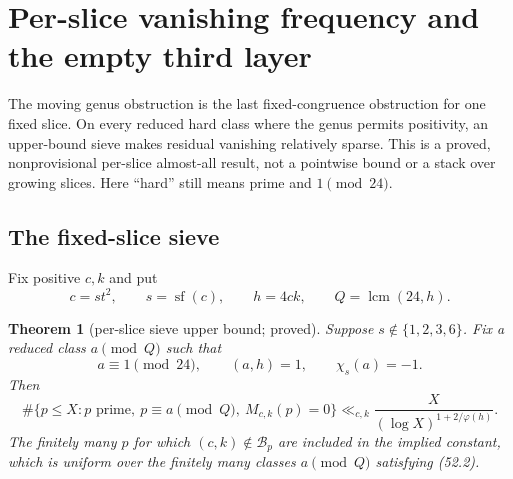 \documentclass[10pt,reqno]{amsart}
\newtheorem{theorem}{Theorem}[section]
\theoremstyle{definition}
\newcommand{\lcm}{\operatorname {lcm}}
\newcommand{\1}{\mathbf 1}
\begin{document}
\section{Per-slice vanishing frequency and the empty third layer}
\label{sec:slice-sieve}
The moving genus obstruction is the last fixed-congruence obstruction for
one fixed slice.  On every reduced hard class where the genus permits
positivity, an upper-bound sieve makes residual vanishing relatively sparse.
This is a proved, nonprovisional per-slice almost-all result, not a pointwise
bound or a stack over growing slices.  Here ``hard'' still means prime and
$1\pmod {24}$.

\subsection{The fixed-slice sieve}
Fix positive $c,k$ and put
\begin{equation}\tag{52.1}
 c=st^2,\qquad s=\operatorname {sf}(c),\qquad
 h=4ck,\qquad Q=\lcm(24,h).
\end{equation}
\begin{theorem}[per-slice sieve upper bound; proved]
\label{thm:per-slice-sieve}
Suppose $s\notin\{1,2,3,6\}$.  Fix a reduced class $a\pmod Q$ such that
\begin{equation}\tag{52.2}
 a\equiv1\pmod {24},\qquad (a,h)=1,\qquad \chi_s(a)=-1.
\end{equation}
Then
\begin{equation}\tag{52.3}
 \#\{p\leq X:p\text{ prime},\ p\equiv a\pmod Q,
                    \ M_{c,k}(p)=0\}
 \ll_{c,k}\frac{X}{(\log X)^{1+2/\varphi(h)}}.
\end{equation}
The finitely many $p$ for which $(c,k)\notin\mathcal B_p$ are included in
the implied constant, which is uniform over the finitely many classes
$a\pmod Q$ satisfying (52.2).
\end{theorem}
\end{document}
